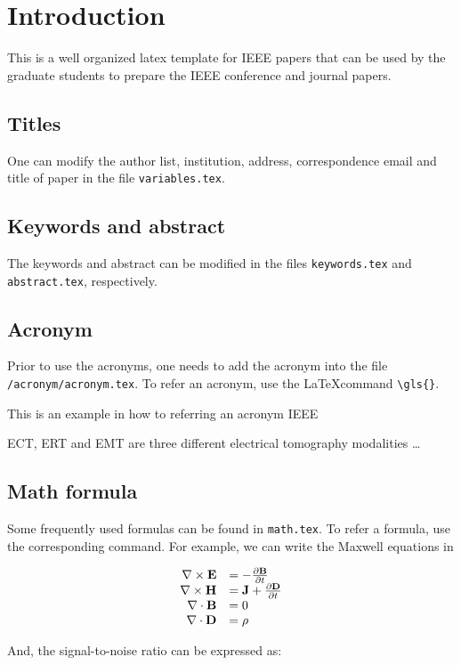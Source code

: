 

\section{Introduction}
\label{sec:introduction}

This is a well organized latex template for IEEE papers that can be used by  the graduate students to prepare the IEEE conference and journal papers. 



\subsection{Titles}

One can modify the author list, institution, address, correspondence email and title of paper in the file \verb+variables.tex+.


\subsection{Keywords and abstract}
The keywords and abstract can be modified in the files \verb+keywords.tex+ and \verb+abstract.tex+, respectively.


\subsection{Acronym}

Prior to use the acronyms, one needs to add the acronym into the file \verb+/acronym/acronym.tex+. 
To refer an acronym, use the \LaTeX  command \verb+\gls{}+. 

This is an example in how to referring an acronym \gls{IEEE}

\gls{ECT}, \gls{ERT} and \gls{EMT} are three different electrical tomography modalities \ldots


\subsection{Math formula}

Some frequently used formulas can be found in \verb+math.tex+. 
To refer a formula, use the corresponding command. 
For example, we can write the Maxwell equations in 

\begin{equation}\label{eq:maxwell}
  \begin{array}{rl} \nabla\times {\mathbf{E}}&=-\frac{\partial {\mathbf{B}}}{\partial t} \\ \nabla\times {\mathbf{H}}&={\mathbf{J}}+\frac{\partial {\mathbf{D}}}{\partial t} \\ \nabla\cdot {\mathbf{B}}&=0 \\ \nabla\cdot {\mathbf{D}}&=\rho \\ \end{array}
\end{equation}

And, the signal-to-noise ratio can be expressed as:

